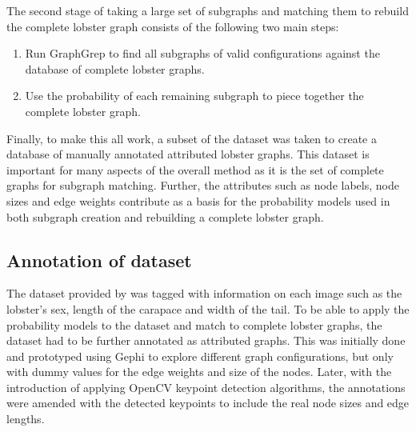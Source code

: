 \noindent
The second stage of taking a large set of subgraphs and matching them to rebuild the complete lobster graph consists of the following two main steps:
\begin{enumerate}
\item Run GraphGrep to find all subgraphs of valid configurations against the database of complete lobster graphs. 
\item Use the probability of each remaining subgraph to piece together the complete lobster graph.
\end{enumerate}
Finally, to make this all work, a subset of the dataset was taken to create a database of manually annotated attributed lobster graphs. This dataset is important for many aspects of the overall method as it is the set of complete graphs for subgraph matching. Further, the attributes such as node labels, node sizes and edge weights contribute as a basis for the probability models used in both subgraph creation and rebuilding a complete lobster graph. 


\subsection{Annotation of dataset}
The dataset provided by \cite{lobster-thesis} was tagged with information on each image such as the lobster's sex, length of the carapace and width of the tail. To be able to apply the probability models to the dataset and match to complete lobster graphs, the dataset had to be further annotated as attributed graphs. This was initially done and prototyped using Gephi to explore different graph configurations, but only with dummy values for the edge weights and size of the nodes. Later, with the introduction of applying OpenCV keypoint detection algorithms, the annotations were amended with the detected keypoints to include the real node sizes and edge lengths.

